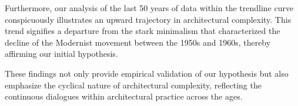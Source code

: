 Furthermore, our analysis of the last 50 years of data within the trendline curve conspicuously illustrates an upward trajectory in architectural complexity.
This trend signifies a departure from the stark minimalism that characterized the decline of the Modernist movement between the 1950s and 1960s, thereby affirming our initial hypothesis.

These findings not only provide empirical validation of our hypothesis but also emphasize the cyclical nature of architectural complexity, reflecting the continuous dialogues within architectural practice across the ages.







